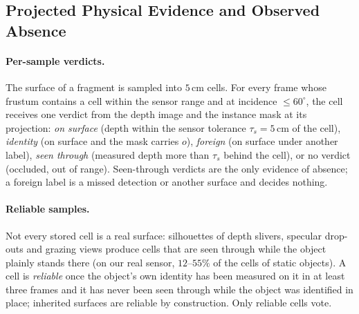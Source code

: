 \subsection{Projected Physical Evidence and Observed Absence}
\label{sec:absence}

\paragraph{Per-sample verdicts.}
The surface of a fragment is sampled into $5$\,cm cells. For every frame whose
frustum contains a cell within the sensor range and at incidence $\le 60^\circ$,
the cell receives one verdict from the depth image and the instance mask at its
projection: \emph{on surface} (depth within the sensor tolerance $\tau_s=5$\,cm
of the cell), \emph{identity} (on surface and the mask carries $o$),
\emph{foreign} (on surface under another label), \emph{seen through} (measured
depth more than $\tau_s$ behind the cell), or no verdict (occluded, out of
range). Seen-through verdicts are the only evidence of absence; a foreign label
is a missed detection or another surface and decides nothing.

\paragraph{Reliable samples.}
Not every stored cell is a real surface: silhouettes of depth slivers, specular
drop-outs and grazing views produce cells that are seen through while the object
plainly stands there (on our real sensor, $12$--$55\%$ of the cells of static
objects). A cell is \emph{reliable} once the object's own identity has been
measured on it in at least three frames and it has never been seen through
while the object was identified in place; inherited surfaces are reliable by
construction. Only reliable cells vote.

